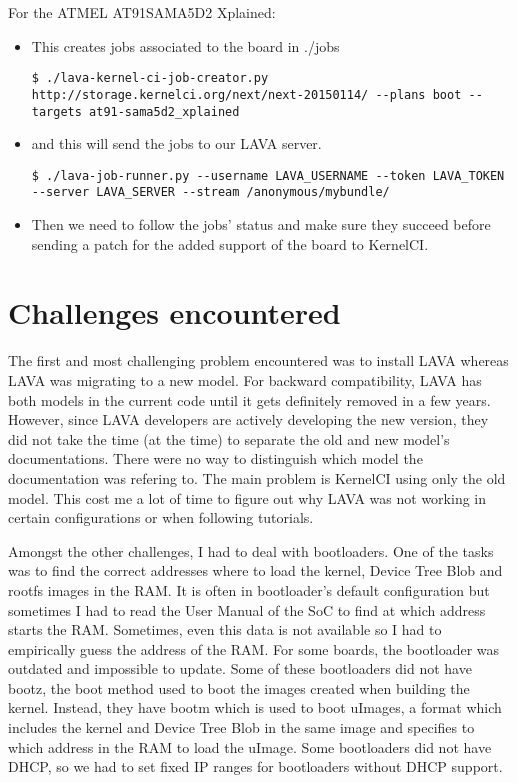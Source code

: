 For the ATMEL AT91SAMA5D2 Xplained:
\begin{itemize}
  \item This creates jobs associated to the board in ./jobs

\begin{verbatim}
$ ./lava-kernel-ci-job-creator.py http://storage.kernelci.org/next/next-20150114/ --plans boot --targets at91-sama5d2_xplained
\end{verbatim}

  \item and this will send the jobs to our LAVA server.

\begin{verbatim}
$ ./lava-job-runner.py --username LAVA_USERNAME --token LAVA_TOKEN --server LAVA_SERVER --stream /anonymous/mybundle/
\end{verbatim}

  \item Then we need to follow the jobs' status and make sure they succeed before sending a patch for the added support of the board to KernelCI.
\end{itemize}

\section{Challenges encountered}
The first and most challenging problem encountered was to install LAVA whereas LAVA was migrating to a new model. For backward compatibility, LAVA has both models in the current code until it gets definitely removed in a few years. However, since LAVA developers are actively developing the new version, they did not take the time (at the time) to separate the old and new model's documentations. There were no way to distinguish which model the documentation was refering to. The main problem is KernelCI using only the old model. This cost me a lot of time to figure out why LAVA was not working in certain configurations or when following tutorials.

Amongst the other challenges, I had to deal with bootloaders. One of the tasks was to find the correct addresses where to load the kernel, Device Tree Blob and rootfs images in the RAM. It is often in bootloader's default configuration but sometimes I had to read the User Manual of the SoC to find at which address starts the RAM. Sometimes, even this data is not available so I had to empirically guess the address of the RAM. For some boards, the bootloader was outdated and impossible to update. Some of these bootloaders did not have bootz, the boot method used to boot the images created when building the kernel. Instead, they have bootm which is used to boot uImages, a format which includes the kernel and Device Tree Blob in the same image and specifies to which address in the RAM to load the uImage. Some bootloaders did not have DHCP, so we had to set fixed IP ranges for bootloaders without DHCP support.

